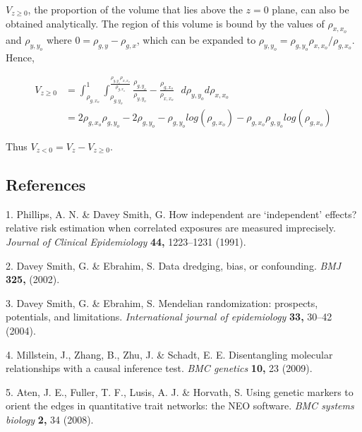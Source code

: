 \documentclass[]{article}
\begin{document}
\(V_{z \ge 0}\), the proportion of the volume that lies above the
\(z=0\) plane, can also be obtained analytically. The region of this
volume is bound by the values of \(\rho_{x,x_o}\) and \(\rho_{y,y_o}\)
where \(0 = \rho_{g,y} - \rho_{g,x}\), which can be expanded to
\(\rho_{y,y_o} = \rho_{g,y_o}\rho_{x,x_o} / \rho_{g,x_o}\). Hence,

\[
\begin{aligned}
V_{z \ge 0} & = \int^1_{\rho_{g,x_o}} \int^{\frac{\rho_{g,y_o}\rho_{x,x_o}}{\rho_{g,x_o}}}_{\rho_{g,y_o}} \frac{\rho_{g,y_o}}{\rho_{y,y_o}} - \frac{\rho_{g,x_o}}{\rho_{x,x_o}}\,\,\,\, d\rho_{y,y_o}d\rho_{x,x_o} \\
& = 2\rho_{g,x_o}\rho_{g,y_o} - 2\rho_{g,y_o} - \rho_{g,y_o}log(\rho_{g,x_o}) - \rho_{g,x_o}\rho_{g,y_o}log(\rho_{g,x_o})
\end{aligned}
\]

Thus \(V_{z < 0} = V_{z} - V_{z \geq 0}\).

\newpage

\subsection*{References}\label{references}

\hypertarget{refs}{}
\hypertarget{ref-Phillips1991}{}
1. Phillips, A. N. \& Davey Smith, G. How independent are `independent'
effects? relative risk estimation when correlated exposures are measured
imprecisely. \emph{Journal of Clinical Epidemiology} \textbf{44,}
1223--1231 (1991).

\hypertarget{ref-DaveySmith2002}{}
2. Davey Smith, G. \& Ebrahim, S. Data dredging, bias, or confounding.
\emph{BMJ} \textbf{325,} (2002).

\hypertarget{ref-DaveySmith2004}{}
3. Davey Smith, G. \& Ebrahim, S. Mendelian randomization: prospects,
potentials, and limitations. \emph{International journal of
epidemiology} \textbf{33,} 30--42 (2004).

\hypertarget{ref-Millstein2009}{}
4. Millstein, J., Zhang, B., Zhu, J. \& Schadt, E. E. Disentangling
molecular relationships with a causal inference test. \emph{BMC
genetics} \textbf{10,} 23 (2009).

\hypertarget{ref-Aten2008}{}
5. Aten, J. E., Fuller, T. F., Lusis, A. J. \& Horvath, S. Using genetic
markers to orient the edges in quantitative trait networks: the NEO
software. \emph{BMC systems biology} \textbf{2,} 34 (2008).
\end{document}
